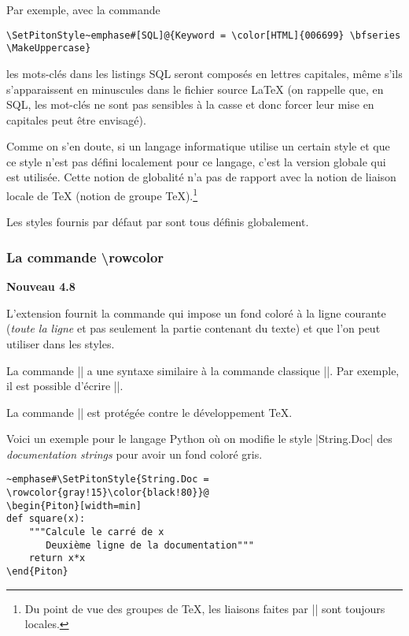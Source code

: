 \documentclass[dvipsnames,svgnames]{article}
\begin{document}
\medskip
Par exemple, avec la commande 
\begin{Verbatim}
\SetPitonStyle~emphase#[SQL]@{Keyword = \color[HTML]{006699} \bfseries \MakeUppercase}
\end{Verbatim}
les mots-clés dans les listings SQL seront composés en lettres capitales, même s'ils
s'apparaissent en minuscules dans le fichier source LaTeX (on rappelle que, en SQL, les
mot-clés ne sont pas sensibles à la casse et donc forcer leur mise en capitales peut être
envisagé).

\medskip
Comme on s'en doute, si un langage informatique utilise un certain style et que ce style
n'est pas défini localement pour ce langage, c'est la version globale qui est utilisée.
Cette notion de globalité n'a pas de rapport avec la notion de liaison locale de TeX
(notion de groupe TeX).\footnote{Du point de vue des groupes de TeX, les liaisons faites
  par |\SetPitonStyle| sont toujours locales.}

\medskip
Les styles fournis par défaut par  sont tous définis globalement.


\bigskip
\subsubsection{La commande \textbackslash rowcolor}

\label{rowcolor}

\colorbox{yellow!50}{\textbf{Nouveau 4.8}}

\nobreak
\medskip
L'extension  fournit la commande  qui impose un
fond coloré à la ligne courante (\emph{toute la ligne} et pas seulement la partie
contenant du texte) et que l'on peut utiliser dans les styles.

\smallskip
La commande |\rowcolor| a une syntaxe similaire à la commande classique |\color|. Par
exemple, il est possible d'écrire ||.

\smallskip
La commande |\rowcolor| est protégée contre le développement TeX.

\smallskip
Voici un exemple pour le langage Python où on modifie le style |String.Doc|
des \emph{documentation strings} pour avoir un fond coloré gris.


\medskip
\begin{Verbatim}
~emphase#\SetPitonStyle{String.Doc = \rowcolor{gray!15}\color{black!80}}@
\begin{Piton}[width=min]
def square(x):
    """Calcule le carré de x
       Deuxième ligne de la documentation"""
    return x*x
\end{Piton}
\end{Verbatim}
\end{document}
